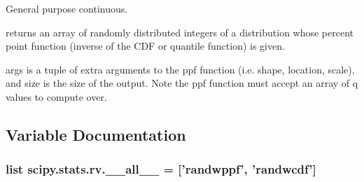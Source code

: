General purpose continuous. 

\begin{DoxyVerb}returns an array of randomly distributed integers of a distribution
whose percent point function (inverse of the CDF or quantile function)
is given.

args is a tuple of extra arguments to the ppf function (i.e. shape,
location, scale), and size is the size of the output.  Note the ppf
function must accept an array of q values to compute over.\end{DoxyVerb}
 

\subsection{Variable Documentation}
\hypertarget{namespacescipy_1_1stats_1_1rv_a18083c1fd557047ee83ecbb055ee84d7}{}
\subsubsection[{\+\_\+\+\_\+all\+\_\+\+\_\+}]{\setlength{\rightskip}{0pt plus 5cm}list scipy.\+stats.\+rv.\+\_\+\+\_\+all\+\_\+\+\_\+ = \mbox{[}'{\bf randwppf}', '{\bf randwcdf}'\mbox{]}}\label{namespacescipy_1_1stats_1_1rv_a18083c1fd557047ee83ecbb055ee84d7}
